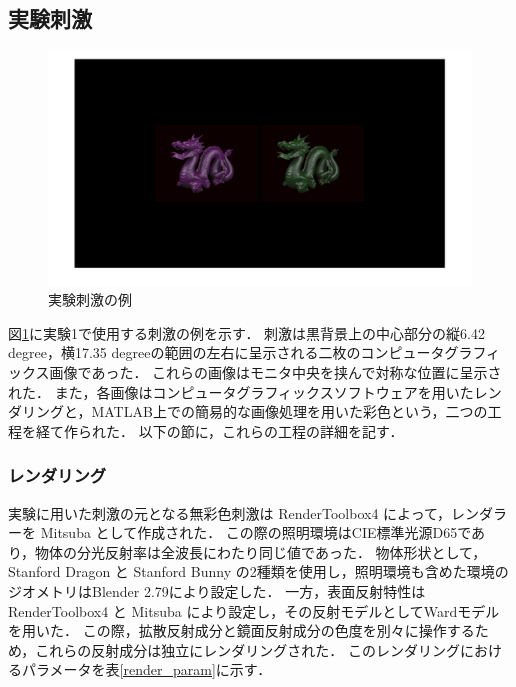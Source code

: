         \subsection{実験刺激}

            \begin{figure}[h]
                \centering
                \includegraphics[width=14.0cm]{./img/ex1_stimuli.png}
                \caption{実験刺激の例}
                \label{ex1_stimuli}
            \end{figure}

            図\ref{ex1_stimuli}に実験1で使用する刺激の例を示す．
            刺激は黒背景上の中心部分の縦6.42 degree，横17.35 degreeの範囲の左右に呈示される二枚のコンピュータグラフィックス画像であった．
            これらの画像はモニタ中央を挟んで対称な位置に呈示された．
            また，各画像はコンピュータグラフィックスソフトウェアを用いたレンダリングと，MATLAB上での簡易的な画像処理を用いた彩色という，二つの工程を経て作られた．
            以下の節に，これらの工程の詳細を記す．

            \subsubsection{レンダリング}
                実験に用いた刺激の元となる無彩色刺激は RenderToolbox4 によって，レンダラーを Mitsuba\cite{Mitsuba} として作成された．
                この際の照明環境はCIE標準光源D65であり，物体の分光反射率は全波長にわたり同じ値であった．
                物体形状として，Stanford Dragon と Stanford Bunny \cite{StanfordModels} の2種類を使用し，照明環境も含めた環境のジオメトリはBlender 2.79により設定した．
                一方，表面反射特性は RenderToolbox4 と Mitsuba により設定し，その反射モデルとしてWardモデル\cite{Ward}を用いた．
                この際，拡散反射成分と鏡面反射成分の色度を別々に操作するため，これらの反射成分は独立にレンダリングされた．
                このレンダリングにおけるパラメータを表\ref{render_param}に示す．

